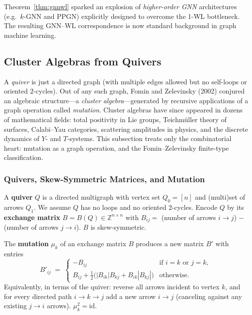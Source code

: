 \begin{remark}
Theorem~\ref{thm:gnnwl} sparked an explosion of \emph{higher-order
GNN} architectures (e.g.\ $k$-GNN and PPGN) explicitly designed
to overcome the 1-WL bottleneck. The resulting GNN--WL correspondence
is now standard background in graph machine learning.
\end{remark}

\subsection{Cluster Algebras from Quivers}\label{subsec:cluster-algebras}

A \emph{quiver} is just a directed graph (with multiple edges allowed
but no self-loops or oriented $2$-cycles). Out of any such graph,
Fomin and Zelevinsky (2002) conjured an algebraic structure---a
\emph{cluster algebra}---generated by recursive applications of a
graph operation called \emph{mutation}. Cluster algebras have since
appeared in dozens of mathematical fields: total positivity in Lie
groups, Teichm\"uller theory of surfaces, Calabi--Yau categories,
scattering amplitudes in physics, and the discrete dynamics of $Y$-
and $T$-systems. This subsection treats only the combinatorial heart:
mutation as a graph operation, and the Fomin--Zelevinsky finite-type
classification.

\subsubsection{Quivers, Skew-Symmetric Matrices, and Mutation}

\begin{definition}[Quiver]\label{def:quiver}
A \textbf{quiver} $Q$ is a directed multigraph with vertex set
$Q_0 = [n]$ and (multi)set of arrows $Q_1$. We assume $Q$ has no
loops and no oriented $2$-cycles. Encode $Q$ by its
\textbf{exchange matrix} $B = B(Q) \in \mathbb Z^{n \times n}$ with
$B_{ij} = $ (number of arrows $i \to j$) $-$ (number of arrows $j \to i$).
$B$ is skew-symmetric.
\end{definition}

\begin{definition}\label{def:mutation}
The \textbf{mutation} $\mu_k$ of an exchange matrix $B$ produces a
new matrix $B'$ with entries
\[
  B'_{ij} \;=\;
  \begin{cases}
    -B_{ij} & \text{if } i = k \text{ or } j = k, \\
    B_{ij} + \frac{1}{2}\big(|B_{ik}| B_{kj} + B_{ik} |B_{kj}|\big) & \text{otherwise}.
  \end{cases}
\]
Equivalently, in terms of the quiver: reverse all arrows incident to
vertex $k$, and for every directed path $i \to k \to j$ add a new
arrow $i \to j$ (canceling against any existing $j \to i$ arrows).
$\mu_k^2 = \mathrm{id}$.
\end{definition}

